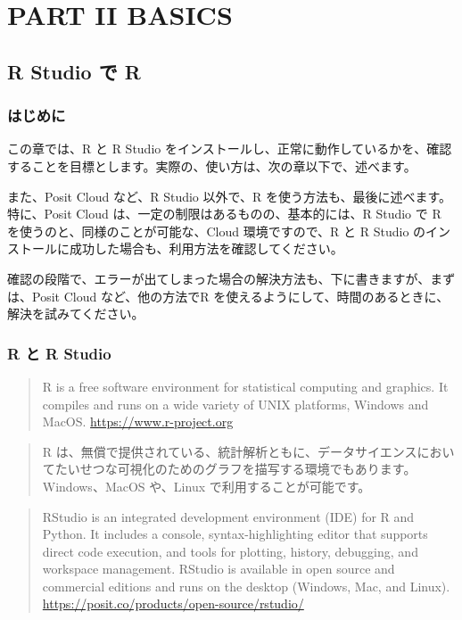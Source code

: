 \documentclass[
  xelatex, ja=standard]{bxjsbook}
\theoremstyle{definition}
\theoremstyle{definition}
\theoremstyle{definition}
\theoremstyle{definition}
\theoremstyle{remark}
\begin{document}
\hypertarget{part-part-ii-basics}{%
\part{PART II BASICS}\label{part-part-ii-basics}}

\hypertarget{ronrstudio}{%
\chapter{R Studio で R}\label{ronrstudio}}

\hypertarget{ux306fux3058ux3081ux306b}{%
\section{はじめに}\label{ux306fux3058ux3081ux306b}}

この章では、R と R Studio をインストールし、正常に動作しているかを、確認することを目標とします。実際の、使い方は、次の章以下で、述べます。

また、Posit Cloud など、R Studio 以外で、R を使う方法も、最後に述べます。特に、Posit Cloud は、一定の制限はあるものの、基本的には、R Studio で R を使うのと、同様のことが可能な、Cloud 環境ですので、R と R Studio のインストールに成功した場合も、利用方法を確認してください。

確認の段階で、エラーが出てしまった場合の解決方法も、下に書きますが、まずは、Posit Cloud など、他の方法でR を使えるようにして、時間のあるときに、解決を試みてください。

\hypertarget{r-ux3068-r-studio}{%
\section{R と R Studio}\label{r-ux3068-r-studio}}

\begin{quote}
R is a free software environment for statistical computing and graphics. It compiles and runs on a wide variety of UNIX platforms, Windows and MacOS. \url{https://www.r-project.org}
\end{quote}

\begin{quote}
R は、無償で提供されている、統計解析ともに、データサイエンスにおいてたいせつな可視化のためのグラフを描写する環境でもあります。Windows、MacOS や、Linux で利用することが可能です。
\end{quote}

\begin{quote}
RStudio is an integrated development environment (IDE) for R and Python. It includes a console, syntax-highlighting editor that supports direct code execution, and tools for plotting, history, debugging, and workspace management. RStudio is available in open source and commercial editions and runs on the desktop (Windows, Mac, and Linux).　\url{https://posit.co/products/open-source/rstudio/}
\end{quote}
\end{document}
